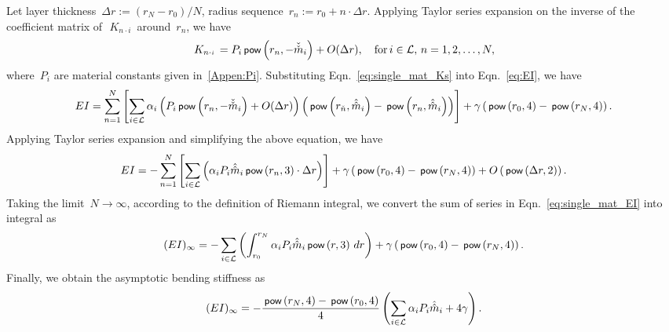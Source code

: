 \documentclass[preprint,12pt,times]{elsarticle}
\newcommand{\plus}[1]{\hat{#1}}
\newcommand{\plusplus}[1]{\plus{\plus{#1}}}
\newcommand{\minus}[1]{\check{#1}}
\newcommand{\minusminus}[1]{\minus{\minus{#1}}}
\numberwithin{equation}{section}
\newcommand{\pr}[1]{\left( #1 \right)}
\newcommand{\p}{\,\textsf{\small pow}}
\newcommand{\Ksub}[2]{\,K_{ {#1}\cdot {\scriptscriptstyle #2}}\,}
\renewcommand{\>}{$\Rightarrow$}
\begin{document}
Let layer thickness~$\Delta r := \pr{r_{N}-r_{0}}/N$, radius sequence~$r_{n} := r_{0} + n\cdot \Delta r$. Applying Taylor series expansion on the inverse of the coefficient matrix of~$\Ksub{n}{i}$ around~$r_{n}$, we have
\begin{equation}
	\Ksub{n}{i} = P_i  \p\pr{r_{n},- \minusminus{m}_i  } + O(\Delta r), \quad \text{for}\, i \in \mathcal{L},\, n = 1,2,\dots,N,
	\label{eq:single_mat_Ks}
\end{equation}
where~$P_i$ are material constants given in~\ref{Appen:Pi}. Substituting Eqn.~\eqref{eq:single_mat_Ks} into Eqn.~\eqref{eq:EI}, we have
\begin{equation*}
EI  = \sum_{n=1}^{N} \left[ \sum_{i \in \mathcal{L}} \alpha_i \left( P_i \p\pr{r_{n},- \minusminus{m}_i} + O(\Delta r) \right) \pr{\p\pr{r_{\minus{n}}, \plusplus{m}_i} - \p\pr{r_{n},\plusplus{m}_i}} \right] + \gamma \pr{\p\pr{r_{0},4} - \p\pr{r_{N},4}} .
\end{equation*}
Applying Taylor series expansion and simplifying the above equation, we have
\begin{equation}
	EI = - \sum_{n=1}^{N} \left[ \sum_{i \in \mathcal{L}} \left( \alpha_i P_i \plusplus{m}_i \p\pr{r_{n},3} \cdot \Delta r \right) \right] + \gamma \pr{\p\pr{r_{0},4} - \p\pr{r_{N},4}} + O\pr{\p\pr{\Delta r,2}}.
\label{eq:single_mat_EI}
\end{equation}
Taking the limit~$N \to \infty$, according to the definition of Riemann integral, we convert the sum of series in Eqn.~\eqref{eq:single_mat_EI} into integral as
\begin{equation*}
(EI)_{\infty}  = - \sum_{i \in \mathcal{L}} \left( \int_{r_{0}}^{r_{N}} \alpha_i P_i \plusplus{m}_i \p\pr{r,3} \, dr \right) + \gamma \pr{\p\pr{r_{0},4} - \p\pr{r_{N},4}}.
\end{equation*}
Finally, we obtain the asymptotic bending stiffness as
\begin{equation}
	(EI)_{\infty} =- \frac{\p\pr{r_{N},4} - \p\pr{r_{0},4}}{4} \left( \sum_{i \in \mathcal{L}} \alpha_i P_i \plusplus{m}_i + 4\gamma\right).
	\label{eq:single_mat_EI_final}
\end{equation}

\end{document}
